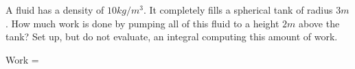 \documentclass{ximera}
\author{Steven Gubkin}
\begin{document}
\begin{exercise}


A fluid has a density of $10 \unit{kg}/\unit{m^3}$.  It completely fills a spherical tank of radius $3 \unit{m}$.  How much work is done by pumping all of this fluid to a height $2 \unit{m}$ above the tank?  Set up, but do not evaluate, an integral computing  this amount of work.

\begin{prompt}
	\textrm{Work} = 
\end{prompt}

\end{exercise}
\end{document}
